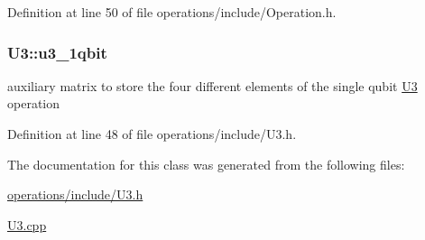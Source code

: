 Definition at line 50 of file operations/include/\+Operation.\+h.

\subsubsection[{\texorpdfstring{u3\+\_\+1qbit}{u3_1qbit}}]{ U3\+::u3\+\_\+1qbit\hspace{0.3cm}{\ttfamily [protected]}}\hypertarget{class_u3_a1fe5b68f0d829ce4265007564c53414a}{}\label{class_u3_a1fe5b68f0d829ce4265007564c53414a}


auxiliary matrix to store the four different elements of the single qubit \hyperlink{class_u3}{U3} operation 



Definition at line 48 of file operations/include/\+U3.\+h.



The documentation for this class was generated from the following files\+:\begin{DoxyCompactItemize}
\item 
\hyperlink{operations_2include_2_u3_8h}{operations/include/\+U3.\+h}\item 
\hyperlink{_u3_8cpp}{U3.\+cpp}\end{DoxyCompactItemize}
